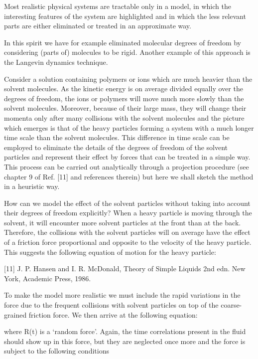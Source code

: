 \documentclass[../../main-notes.tex]{subfiles}
\begin{document}
Most realistic physical systems are tractable only in a model, in which the interesting features of the system are highlighted and in which the less relevant parts are either eliminated or treated in an approximate way. 

In this spirit we have for example eliminated molecular degrees of freedom by considering (parts of) molecules to be rigid. 
Another example of this approach is the Langevin dynamics technique. 

Consider a solution containing polymers or ions which are much heavier than the solvent molecules. 
As the kinetic energy is on average divided equally over the degrees of freedom, the ions or polymers will move much more slowly than the solvent molecules.
Moreover, because of their large mass, they will change their momenta only after many collisions with the solvent molecules and the picture which emerges is that of the heavy particles forming a system with a much longer time scale than the solvent molecules.
This difference in time scale can be employed to eliminate the details of the degrees of freedom of the solvent particles and represent their effect by forces that can be treated in a simple way.
This process can be carried out analytically through a projection procedure (see chapter 9 of Ref. [11] and references therein) but here we shall sketch the method in a heuristic way.

How can we model the effect of the solvent particles without taking into account their degrees of freedom explicitly? 
When a heavy particle is moving through the solvent, it will encounter more solvent particles at the front than at the back. 
Therefore, the collisions with the solvent particles will on average have the effect of a friction force proportional and opposite to the velocity of the heavy particle. 
This suggests the following equation of motion for the heavy particle:

[11] J. P. Hansen and I. R. McDonald, Theory of Simple Liquids 2nd edn. New York, Academic Press, 1986.

To make the model more realistic we must include the rapid variations in the force due to the frequent collisions with solvent particles on top of the coarse-grained friction force. 
We then arrive at the following equation:

where R(t) is a ‘random force’.
Again, the time correlations present in the fluid should show up in this force, but they are neglected once more and the force is subject to the following conditions 
\end{document}
